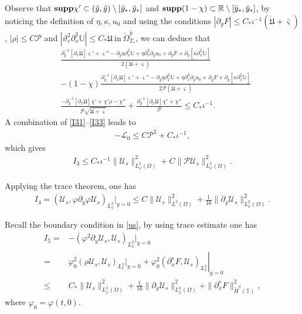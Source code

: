 \documentclass{amsart}
\numberwithin{equation}{section}
\begin{document}
Observe that ${\bf supp}\chi' \subset(\check{y},\hat{y})\setminus[\check{y}_{*},\hat{y}_{*}]$ and
${\bf supp}(1-\chi) \subset\mathbb{R}\setminus[\check{y}_{*},\hat{y}_{*}]$,
by noticing the definition of $\eta,\kappa,u_{0}$  and using the conditions $|\partial_{y}F|\leq C_{*}\iota^{-1}(\dot{\mathfrak{U}}+\bar{\varsigma})$, $|\rho|\leq C\mathcal{P}$ and $|\vartheta_{c}^{2}\partial_{x}^{2}\mathbb{U}|\leq C_{*}\dot{\mathfrak{U}}~\text{in}~\check{\Omega}_{T_{*}}^{\hat{y}}$, we can deduce that
\begin{align}\label{I33}
&\frac{\partial_{y}^{-1}\left[\partial_{x}\dot{\mathfrak{U}}\right]\varsigma'+\varsigma''-\partial_{y}\eta\partial_{x}^{2}\mathbb{U}+\eta\partial_{x}^{2}\partial_{y}u_{0}+\partial_{y}F+\partial_{y}[\kappa\partial_{x}^{2}\mathbb{U}]}{2(\dot{\mathfrak{U}}+\varsigma)}\\
&-(1-\chi)\frac{\partial_{y}^{-1}\left[\partial_{x}\mathfrak{U}\right]\varsigma'+\varsigma''-\partial_{y}\eta\partial_{x}^{2}\mathbb{U}+\eta\partial_{x}^{2}\partial_{y}u_{0}+\partial_{y}F+\partial_{y}[\kappa\partial_{x}^{2}\mathbb{U}]}{2\mathcal{P}(\dot{\mathfrak{U}}+\varsigma)}\nonumber\\
&\frac{-\partial_{y}^{-1}[\partial_{x}\mathfrak{U}]\chi'+\chi'\rho-\chi''}{\mathcal{P}\sqrt{\dot{\mathfrak{U}}+\varsigma}}
+\frac{\partial_{y}^{-1}\left[\partial_{x}\mathfrak{U}\right]\chi'+\chi''}{\mathcal{P}}
\leq C_{*}\iota^{-1}.\nonumber
\end{align}
A combination of \eqref{I31}--\eqref{I33} leads to
\begin{align*}
-\mathcal{L}_{0}\leq C\mathcal{P}^{2}+C_{*}\iota^{-1},
\end{align*}
which gives
\begin{align*}
I_{3}
\leq C_{*}\iota^{-1}\|\mathcal{U}_{s}\|_{L_{\varphi}^{2}(\Omega)}^{2}
    +C\|\mathcal{P}\mathcal{U}_{s}\|_{L_{\varphi}^{2}(\Omega)}^{2}.
\end{align*}

Applying the trace theorem, one has
\begin{align*}
I_{4}
=(\mathcal{U}_{s},\varphi\partial_{y}\varphi\mathcal{U}_{s})_{L_{x}^{2}}|_{y=0}
\leq C\|\mathcal{U}_{s}\|_{L^{2}(\Omega)}^{2}
     +\frac{1}{16}\|\partial_{y}\mathcal{U}_{s}\|_{L_{\varphi}^{2}(\Omega)}^{2}.
\end{align*}


Recall the boundary condition in \eqref{us}, by using trace estimate one has
\begin{align*}
I_{5}
=&-(\varphi^{2}\partial_{y}\mathcal{U}_{s},\mathcal{U}_{s})_{L_{x}^{2}}|_{y=0}\\
=& \varphi_{0}^{2}(\rho \mathcal{U}_{s},\mathcal{U}_{s})_{L_{x}^{2}}|_{y=0}
  +\left.\varphi_{0}^{2}(\partial_{x}^{s}F,\mathcal{U}_{s})_{L_{x}^{2}}\right|_{y=0}\\
\leq& C_{*}\|\mathcal{U}_{s}\|_{L_{\varphi}^{2}(\Omega)}^{2}
     +\frac{1}{16}\|\partial_{y}\mathcal{U}_{s}\|_{L_{\varphi}^{2}(\Omega)}^{2}
     +\|\partial_{x}^{s}F\|_{\mathring{H}^{0}(\mathbb{T})}^{2},
\end{align*}
where $\varphi_{0}=\varphi(t,0)$.
\end{document}
